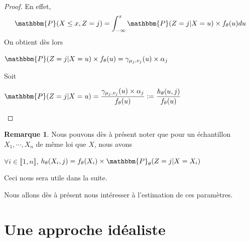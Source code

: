 \documentclass[frenchb]{report}
\newcommand{\1}{\mathbbm{1}}
\newcommand{\prob}{\mathbbm{P}}
\theoremstyle{definition}\newtheorem{defn}{Définition}
\theoremstyle{definition}\newtheorem{exm}{Exemple}
\theoremstyle{definition}\newtheorem{nota}{Notation}
\theoremstyle{definition}\newtheorem{rem}{Remarque}
\begin{document}
\begin{proof}
En effet, 
\begin{align*}
\prob(X\leq x, Z = j) = \displaystyle\int_{-\infty}^x \prob(Z = j | X = u) \times f_\theta(u) du
\end{align*}
On obtient dès lors
\begin{center}
$\prob(Z = j | X = u)\times f_\theta(u) = \gamma_{\mu_j, v_j}(u) \times \alpha_j$
\end{center}
Soit
\begin{center}
$\prob(Z = j | X = u) = \displaystyle\frac{\gamma_{\mu_j, v_j}(u)\times\alpha_j}{f_\theta(u)} := \frac{h_\theta(u,j)}{f_\theta(u)}$
\end{center}
\end{proof}

\begin{rem}
Nous pouvons dès à présent noter que pour un échantillon $X_1, \cdots, X_n$ de même loi que $X$, nous avons 
\begin{center}
$\forall i \in \llbracket 1,n \rrbracket$, $h_\theta(X_i,j) = f_\theta(X_i) \times \prob_\theta(Z = j | X = X_i )$
\end{center}
Ceci nous sera utile dans la suite.
\end{rem}

Nous allons dès à présent nous intéresser à l'estimation de ces paramètres.

\section{Une approche idéaliste}
\end{document}
